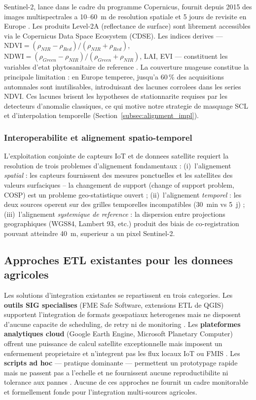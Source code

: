 \documentclass[12pt,a4paper]{article}
\theoremstyle{plain}
\theoremstyle{definition}
\theoremstyle{remark}
\begin{document}
	Sentinel-2, lance dans le cadre du programme Copernicus, fournit depuis
	2015 des images multispectrales a 10--60~m de resolution spatiale et
	5 jours de revisite en Europe \cite{sentinel2_ard_2022}.
	Les produits Level-2A (reflectance de surface) sont librement accessibles
	via le Copernicus Data Space Ecosystem (CDSE). Les indices derives ---
	$\text{NDVI} = (\rho_{NIR}-\rho_{Red})/(\rho_{NIR}+\rho_{Red})$,
	$\text{NDWI} = (\rho_{Green}-\rho_{NIR})/(\rho_{Green}+\rho_{NIR})$,
	LAI, EVI --- constituent les variables d'etat phytosanitaire de reference
	\cite{ndvi_sentinel2_2023,ndvi_timeseries_2022}.
	La couverture nuageuse constitue la principale limitation : en Europe
	temperee, jusqu'a 60\,\% des acquisitions automnales sont inutilisables,
	introduisant des lacunes corrolees dans les series NDVI. Ces lacunes
	brisent les hypotheses de stationnarite requises par les detecteurs
	d'anomalie classiques, ce qui motive notre strategie de masquage SCL
	et d'interpolation temporelle (Section~\ref{subsec:alignment_impl}).
	
	\subsubsection{Interoperabilite et alignement spatio-temporel}
	
	L'exploitation conjointe de capteurs IoT et de donnees satellite requiert
	la resolution de trois problemes d'alignement fondamentaux :
	(i)~l'alignement \emph{spatial} : les capteurs fournissent des mesures
	ponctuelles et les satellites des valeurs surfaciques -- la changement
	de support (change of support problem, COSP) est un probleme geo-statistique
	ouvert \cite{change_of_support} ;
	(ii)~l'alignement \emph{temporel} : les deux sources operent sur des
	grilles temporelles incompatibles (30~min vs 5~j) ;
	(iii)~l'alignement \emph{systemique de reference} : la dispersion
	entre projections geographiques (WGS84, Lambert 93, etc.) produit des
	biais de co-registration pouvant atteindre 40~m, superieur a un pixel
	Sentinel-2.
	
	\subsection{Approches ETL existantes pour les donnees agricoles}
	
	Les solutions d'integration existantes se repartissent en trois categories.
	Les \textbf{outils SIG specialises} (FME Safe Software, extensions ETL
	de QGIS) supportent l'integration de formats geospatiaux heterogenes
	mais ne disposent d'aucune capacite de scheduling, de retry ni de
	monitoring \cite{fme_agri}.
	Les \textbf{plateformes analytiques cloud} (Google Earth Engine,
	Microsoft Planetary Computer) offrent une puissance de calcul satellite
	exceptionnelle mais imposent un enfermement proprietaire et n'integrent
	pas les flux locaux IoT ou FMIS \cite{gee_agriculture}.
	Les \textbf{scripts ad hoc} --- pratique dominante --- permettent un
	prototypage rapide mais ne passent pas a l'echelle et ne fournissent
	aucune reproductibilite ni tolerance aux pannes \cite{pipeline_survey_2024}.
	Aucune de ces approches ne fournit un cadre monitorable et formellement
	fonde pour l'integration multi-sources agricoles.
	
\end{document}
